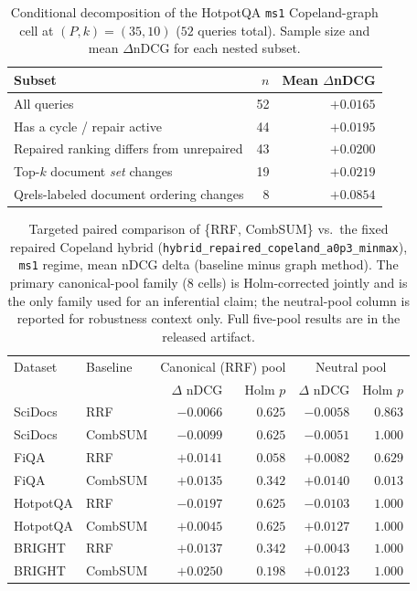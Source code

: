 \documentclass[manuscript,anonymous,review]{acmart}
\begin{document}
\begin{table}[h]
  \caption{Conditional decomposition of the HotpotQA \texttt{ms1}
    Copeland-graph cell at $(P,k)=(35,10)$ ($52$ queries total). Sample size
    and mean
    $\Delta$nDCG for each nested subset.}
  \label{tab:supp-conditional-hotpotqa}
  \scriptsize
  \begin{tabular}{lrr}
    \toprule
    Subset & $n$ & Mean $\Delta$nDCG \\
    \midrule
    All queries                                   & 52 & $+0.0165$ \\
    Has a cycle / repair active                   & 44 & $+0.0195$ \\
    Repaired ranking differs from unrepaired      & 43 & $+0.0200$ \\
    Top-$k$ document \emph{set} changes           & 19 & $+0.0219$ \\
    Qrels-labeled document ordering changes       & 8  & $+0.0854$ \\
    \bottomrule
  \end{tabular}
\end{table}

\begin{table}[h]
  \caption{Targeted paired comparison of \{RRF, CombSUM\} vs.\ the fixed
    repaired Copeland hybrid (\texttt{hybrid\_repaired\_copeland\_a0p3\_minmax}),
    \texttt{ms1} regime, mean nDCG delta (baseline minus graph method). The
    primary canonical-pool family (8 cells) is Holm-corrected jointly and is
    the only family used for an inferential claim; the neutral-pool column is
    reported for robustness context only. Full five-pool results are in the
    released artifact.}
  \label{tab:supp-pool-fairness}
  \scriptsize
  \begin{tabular}{llrrrr}
    \toprule
    Dataset & Baseline & \multicolumn{2}{c}{Canonical (RRF) pool} & \multicolumn{2}{c}{Neutral pool} \\
     & & $\Delta$ nDCG & Holm $p$ & $\Delta$ nDCG & Holm $p$ \\
    \midrule
    SciDocs  & RRF     & $-0.0066$ & $0.625$ & $-0.0058$ & $0.863$ \\
    SciDocs  & CombSUM & $-0.0099$ & $0.625$ & $-0.0051$ & $1.000$ \\
    FiQA     & RRF     & $+0.0141$ & $0.058$ & $+0.0082$ & $0.629$ \\
    FiQA     & CombSUM & $+0.0135$ & $0.342$ & $+0.0140$ & $\mathbf{0.013}$ \\
    HotpotQA & RRF     & $-0.0197$ & $0.625$ & $-0.0103$ & $1.000$ \\
    HotpotQA & CombSUM & $+0.0045$ & $0.625$ & $+0.0127$ & $1.000$ \\
    BRIGHT   & RRF     & $+0.0137$ & $0.342$ & $+0.0043$ & $1.000$ \\
    BRIGHT   & CombSUM & $+0.0250$ & $0.198$ & $+0.0123$ & $1.000$ \\
    \bottomrule
  \end{tabular}
\end{table}
\end{document}
